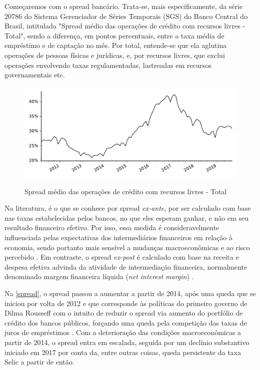 \documentclass[a4paper,
               article,
               12pt,
               openany,
               oneside,
               english,
               brazil]{abntex2}
\numberwithin{equation}{section}
\begin{document}
    Começaremos com o spread bancário. Trata-se, mais especificamente, da série 20786 do Sistema Gerenciador de Séries Temporais (SGS) do Banco Central do Brasil, intitulada "Spread médio das operações de crédito com recursos livres - Total", sendo a diferença, em pontos percentuais, entre a taxa média de empréstimo e de captação no mês. Por total, entende-se que ela aglutina operações de pessoas físicas e jurídicas, e, por recursos livres, que exclui operações envolvendo taxas regulamentadas, lastreadas em recursos governamentais etc.

    \begin{figure}[h]
        \centering
        \caption{Spread médio das operações de crédito com recursos livres - Total}
        \includegraphics[width=\textwidth, scale=0.75]{spread.pdf}
        \label{spread}
    \end{figure}

    Na literatura, é o que se conhece por spread \textit{ex-ante}, por ser calculado com base nas taxas estabelecidas pelos bancos, no que eles esperam ganhar, e não em seu resultado financeiro efetivo. Por isso, essa medida é consideravelmente influenciada pelas expectativas dos intermediários financeiros em relação à economia, sendo portanto mais sensível a mudanças macroeconômicas e ao risco percebido \cite[p.~226]{leal07}. Em contraste, o spread \textit{ex-post} é calculado com base na receita e despesa efetiva advinda da atividade de intermediação financeira, normalmente denominado margem financeira líquida (\textit{net interest margin}) \cite[p.~2]{almeida15}. 
    
    Na \autoref{spread}, o spread passou a aumentar a partir de 2014, após uma queda que se iniciou por volta de 2012 e que corresponde às políticas do primeiro governo de Dilma Rousseff com o intuito de reduzir o spread via aumento do portfólio de crédito dos bancos públicos, forçando uma queda pela competição das taxas de juros de empréstimos \cite[p.~1]{almeida15}. Com a deterioração das condições macroeconômicas a partir de 2014, o spread entra em escalada, seguida por um declínio substantivo iniciado em 2017 por conta da, entre outras coisas, queda persistente da taxa Selic a partir de então.
\end{document}
